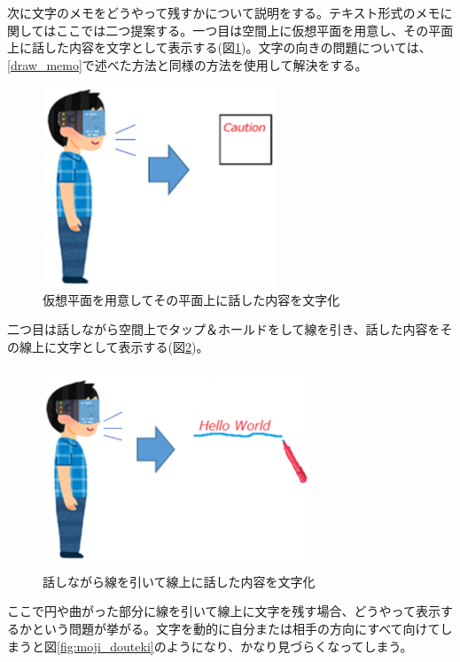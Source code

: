 \documentclass[11pt,a4j, titlepage]{jarticle} %
\begin{document}
次に文字のメモをどうやって残すかについて説明をする。テキスト形式のメモに関してはここでは二つ提案する。一つ目は空間上に仮想平面を用意し、その平面上に話した内容を文字として表示する(図\ref{fig:text_memo})。文字の向きの問題については、\ref{draw_memo}で述べた方法と同様の方法を使用して解決をする。

\begin{figure}[H]
  \begin{center}
    \includegraphics[clip,height=6.0cm,width=7.0cm]{./text_memo.eps}
    \caption{仮想平面を用意してその平面上に話した内容を文字化}
    \label{fig:text_memo}
  \end{center}
\end{figure}

二つ目は話しながら空間上でタップ＆ホールドをして線を引き、話した内容をその線上に文字として表示する(図\ref{fig:text_memo2})。

\begin{figure}[H]
  \begin{center}
    \includegraphics[clip,height=6.0cm,width=8.0cm]{./text_memo2.eps}
    \caption{話しながら線を引いて線上に話した内容を文字化}
    \label{fig:text_memo2}
  \end{center}
\end{figure}

ここで円や曲がった部分に線を引いて線上に文字を残す場合、どうやって表示するかという問題が挙がる。文字を動的に自分または相手の方向にすべて向けてしまうと図\ref{fig:moji_douteki}のようになり、かなり見づらくなってしまう。
\end{document}
